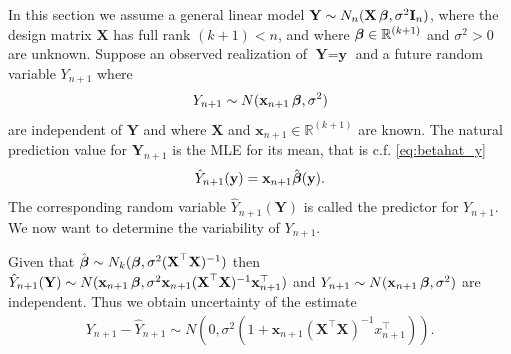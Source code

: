 In this section we assume a general linear model $\textbf{Y}\sim N_n(\textbf{X}\operatorname{\boldsymbol{\beta}}, \sigma^2 \textbf{I}_n)$, where the design matrix $\textbf{X}$ has full rank $(k+1)<n$, and where $\operatorname{\boldsymbol{\beta}} \in \mathbb{R}^{(k+1)}$ and $\sigma^2>0$ are unknown. 
Suppose an observed realization of $\textbf{Y}=\textbf{y}$ and a future random variable $Y_{n+1}$ where
\begin{align*}
    Y_{n+1}\sim N(\textbf{x}_{n+1}\operatorname{\boldsymbol{\beta}},\sigma^2)
\end{align*}
are independent of $\textbf{Y}$ and where $\textbf{X}$ and $\textbf{x}_{n+1}\in\mathbb{R}^{(k+1)}$ are known. 
The natural prediction value for $\textbf{Y}_{n+1}$ is the MLE for its mean, that is c.f. \eqref{eq:betahat_y}
\begin{align*}
    \hat{Y}_{n+1}(\textbf{y})=\textbf{x}_{n+1}\hat{\operatorname{\boldsymbol{\beta}}}(\textbf{y}).
\end{align*}
The corresponding random variable $\hat{Y}_{n+1}(\textbf{Y})$ is called the predictor for $Y_{n+1}$. 
We now want to determine the variability of $Y_{n+1}$.

Given that $\hat{\operatorname{\boldsymbol{\beta}}} \sim N_k(\operatorname{\boldsymbol{\beta}},\sigma^2(\textbf{X}^\top\textbf{X})^{-1})$ then $\hat{Y}_{n+1}(\textbf{Y})\sim N(\textbf{x}_{n+1}\operatorname{\boldsymbol{\beta}},\sigma^2\textbf{x}_{n+1}(\textbf{X}^\top\textbf{X})^{-1}\textbf{x}^\top_{n+1})$ and $Y_{n+1}\sim N(\textbf{x}_{n+1}\operatorname{\boldsymbol{\beta}},\sigma^2)$ are independent.
Thus we obtain uncertainty of the estimate
\begin{align*}
    Y_{n+1}-\hat{Y}_{n+1} \sim N(0, \sigma^2(1+\textbf{x}_{n+1}(\textbf{X}^\top\textbf{X})^{-1}x_{n+1}^\top)).
\end{align*}

